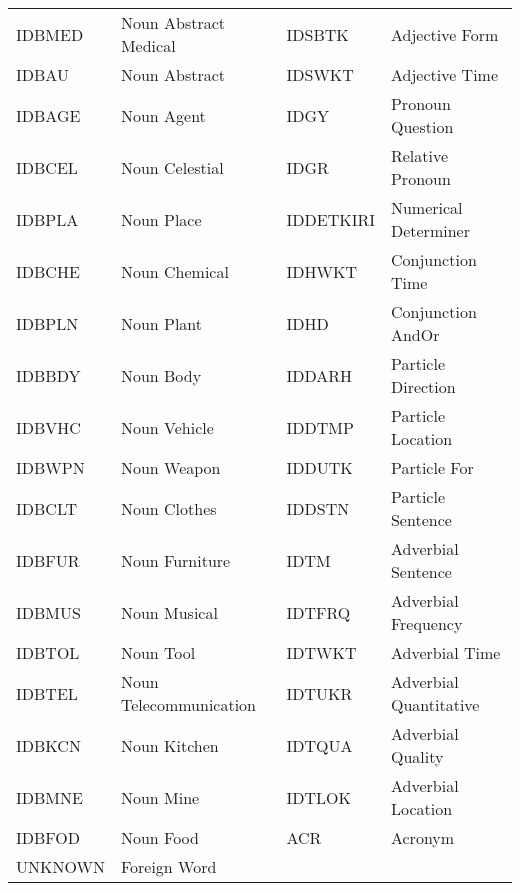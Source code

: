 \documentclass[english]{nlp}
\begin{document}
\begin{table}[ht]
\begin{center}
\begin{tabular}{ll||ll}
IDBMED & Noun Abstract Medical & IDSBTK & Adjective Form\\
IDBAU & Noun Abstract & IDSWKT & Adjective Time\\
IDBAGE & Noun Agent & IDGY & Pronoun Question\\
IDBCEL & Noun Celestial & IDGR & Relative Pronoun\\
IDBPLA & Noun Place & IDDETKIRI & Numerical Determiner\\
IDBCHE & Noun Chemical & IDHWKT & Conjunction Time\\
IDBPLN & Noun Plant & IDHD & Conjunction AndOr\\
IDBBDY & Noun Body & IDDARH & Particle Direction\\
IDBVHC & Noun Vehicle & IDDTMP & Particle Location\\
IDBWPN & Noun Weapon & IDDUTK & Particle For\\
IDBCLT & Noun Clothes & IDDSTN & Particle Sentence\\
IDBFUR & Noun Furniture & IDTM & Adverbial Sentence\\
IDBMUS & Noun Musical & IDTFRQ & Adverbial Frequency\\
IDBTOL & Noun Tool & IDTWKT & Adverbial Time\\
IDBTEL & Noun Telecommunication & IDTUKR & Adverbial Quantitative\\
IDBKCN & Noun Kitchen & IDTQUA & Adverbial Quality\\
IDBMNE & Noun Mine & IDTLOK & Adverbial Location\\
IDBFOD & Noun Food & ACR & Acronym\\
UNKNOWN & Foreign Word & & \\
\hline
\end{tabular}
\end{center}
\end{table}
\end{document}
